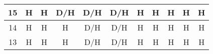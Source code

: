 \documentclass[conference]{IEEEtran}
\begin{document}
\begin{table}[h]
\begin{tabular}{|c|c|c|c|c|c|c|c|c|c|c|}
15 & \cellcolor[HTML]{FE0000}H & \cellcolor[HTML]{FE0000}H & \cellcolor[HTML]{F8FF00}D/H & \cellcolor[HTML]{F8FF00}D/H & \cellcolor[HTML]{F8FF00}D/H & \cellcolor[HTML]{FE0000}H & \cellcolor[HTML]{FE0000}H & \cellcolor[HTML]{FE0000}H & \cellcolor[HTML]{FE0000}H & \cellcolor[HTML]{FE0000}H \\ \hline
14 & \cellcolor[HTML]{FE0000}H & \cellcolor[HTML]{FE0000}H & \cellcolor[HTML]{FE0000}H & \cellcolor[HTML]{F8FF00}D/H & \cellcolor[HTML]{F8FF00}D/H & \cellcolor[HTML]{FE0000}H & \cellcolor[HTML]{FE0000}H & \cellcolor[HTML]{FE0000}H & \cellcolor[HTML]{FE0000}H & \cellcolor[HTML]{FE0000}H \\ \hline
13 & \cellcolor[HTML]{FE0000}H & \cellcolor[HTML]{FE0000}H & \cellcolor[HTML]{FE0000}H & \cellcolor[HTML]{F8FF00}D/H & \cellcolor[HTML]{F8FF00}D/H & \cellcolor[HTML]{FE0000}H & \cellcolor[HTML]{FE0000}H & \cellcolor[HTML]{FE0000}H & \cellcolor[HTML]{FE0000}H & \cellcolor[HTML]{FE0000}H \\ \hline
\end{tabular}
\end{table}
\end{document}
